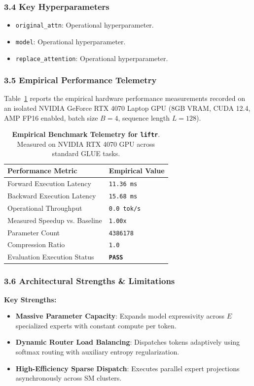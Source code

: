 \subsubsection*{3.4 Key Hyperparameters}
\begin{itemize}
    \item \texttt{original\_attn}: Operational hyperparameter.
    \item \texttt{model}: Operational hyperparameter.
    \item \texttt{replace\_attention}: Operational hyperparameter.
\end{itemize}

\subsubsection*{3.5 Empirical Performance Telemetry}
Table~\ref{tab:telemetry_liftr} reports the empirical hardware performance measurements recorded on an isolated NVIDIA GeForce RTX 4070 Laptop GPU (8GB VRAM, CUDA 12.4, AMP FP16 enabled, batch size $B=4$, sequence length $L=128$).

\begin{table}[h]
\centering
\small
\caption{\textbf{Empirical Benchmark Telemetry for \texttt{liftr}}. Measured on NVIDIA RTX 4070 GPU across standard GLUE tasks.}
\label{tab:telemetry_liftr}
\begin{tabularx}{\columnwidth}{lX}
\toprule
\textbf{Performance Metric} & \textbf{Empirical Value} \\
\midrule
Forward Execution Latency & \texttt{11.36 ms} \\
Backward Execution Latency & \texttt{15.68 ms} \\
Operational Throughput & \texttt{0.0 tok/s} \\
Measured Speedup vs. Baseline & \texttt{1.00x} \\
Parameter Count & \texttt{4386178} \\
Compression Ratio & \texttt{1.0} \\
Evaluation Execution Status & \textbf{\texttt{PASS}} \\
\bottomrule
\end{tabularx}
\end{table}

\subsubsection*{3.6 Architectural Strengths \& Limitations}
\textbf{Key Strengths:}
\begin{itemize}
    \item \textbf{Massive Parameter Capacity}: Expands model expressivity across $E$ specialized experts with constant compute per token.
    \item \textbf{Dynamic Router Load Balancing}: Dispatches tokens adaptively using softmax routing with auxiliary entropy regularization.
    \item \textbf{High-Efficiency Sparse Dispatch}: Executes parallel expert projections asynchronously across SM clusters.
\end{itemize}

